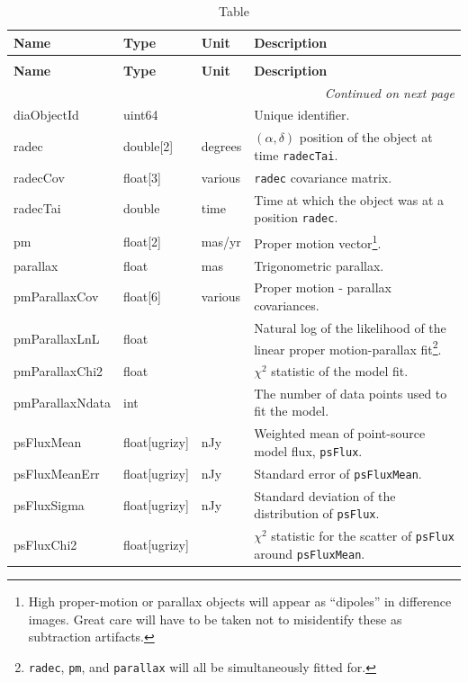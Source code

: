 \documentclass[SE,lsstdraft,toc]{lsstdoc}
\newenvironment{schema}[3]{%
\setlength\LTleft{0pt}
\setlength\LTright{\fill}
\begin{longtable}{p{0.2\textwidth}p{0.14\textwidth}p{0.14\textwidth}p{0.41\textwidth}}

\caption[#1]{#2\label{#3}}\\

\hline \textbf{Name} & \textbf{Type} & \textbf{Unit} & \textbf{Description}\\ \hline
\endfirsthead

\caption[#1]{#2}\\

\hline \textbf{Name} & \textbf{Type} & \textbf{Unit} & \textbf{Description}\\ \hline
\endhead

\hline \multicolumn{4}{r}{\emph{Continued on next page}} \\
\endfoot

\hline\hline
\endlastfoot
}{%
\hline
\end{longtable}
}
\begin{document}
\begin{schema}{\DIAObject Table}{\DIAObject Table}{tbl:diaobjectTable}

diaObjectId & uint64 & ~ & Unique identifier. \\

radec & double[2] & degrees & $(\alpha, \delta)$ position of the object at time \texttt{radecTai}. \\

radecCov & float[3] & various & \texttt{radec} covariance matrix. \\

radecTai & double & time & Time at which the object was at a position \texttt{radec}. \\

pm & float[2] & mas/yr & Proper motion vector\footnote{High proper-motion or parallax objects will appear as ``dipoles'' in difference images. Great care will have to be taken not to misidentify these as subtraction artifacts.}. \\

parallax & float & mas & Trigonometric parallax. \\

pmParallaxCov & float[6] & various & Proper motion - parallax covariances. \\

pmParallaxLnL & float & ~ & Natural log of the likelihood of the linear proper motion-parallax fit\footnote{\texttt{radec}, \texttt{pm}, and \texttt{parallax} will all be simultaneously fitted for.}. \\

pmParallaxChi2 & float & ~ & $\chi^2$ statistic of the model fit. \\

pmParallaxNdata & int & ~ & The number of data points used to fit the model. \\

psFluxMean & float[ugrizy] & nJy & Weighted mean of point-source model flux, \texttt{psFlux}. \\

psFluxMeanErr & float[ugrizy] & nJy & Standard error of \texttt{psFluxMean}.  \\

psFluxSigma & float[ugrizy] & nJy & Standard deviation of the distribution of \texttt{psFlux}. \\

psFluxChi2 & float[ugrizy] & ~ & $\chi^2$ statistic for the scatter of \texttt{psFlux} around \texttt{psFluxMean}. \\


\end{schema}
\end{document}
